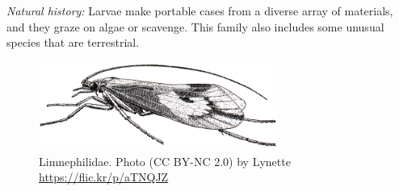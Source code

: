 \documentclass[letterpaper, 11pt]{article}
\begin{document}
\noindent{}\textit{Natural history:} Larvae make portable cases from a diverse array of materials, and they graze on algae or scavenge. This family also includes some unusual species that are terrestrial. \\


\begin{figure}[ht!]
  \centering
    \includegraphics[width=0.7\textwidth]{TrichoImage02}
  \caption{Limnephilidae. Photo (CC BY-NC 2.0) by Lynette \url{https://flic.kr/p/aTNQJZ}}
  \label{fig:phryg}
\end{figure}
\end{document}

